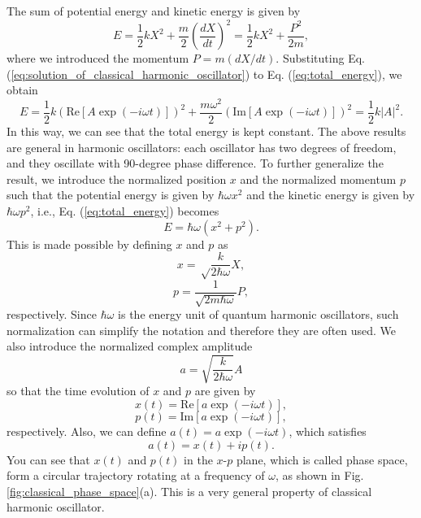 The sum of potential energy and kinetic energy is given by
\begin{equation}
  E = \frac{1}{2}kX^2 + \frac{m}{2}\left(\frac{dX}{dt} \right)^2 = \frac{1}{2}kX^2 + \frac{P^2}{2m},
  \label{eq:total_energy}
\end{equation}
where we introduced the momentum $P = m(dX/dt)$. Substituting Eq. (\ref{eq:solution_of_classical_harmonic_oscillator}) to Eq. (\ref{eq:total_energy}), we obtain
\begin{equation}
  E= \frac{1}{2}k(\mathrm{Re} [A\exp(-i\omega t)])^2 + \frac{m\omega^2}{2} (\mathrm{Im} [A\exp(-i\omega t)])^2 = \frac{1}{2}k|A|^2.
\end{equation}
In this way, we can see that the total energy is kept constant.
The above results are general in harmonic oscillators: each oscillator has two degrees of freedom, and they oscillate with 90-degree phase difference. To further generalize the result, we introduce the normalized position $x$ and the normalized momentum $p$ such that the potential energy is given by $\hbar \omega x^2$ and the kinetic energy is given by $\hbar \omega p^2$, i.e., Eq. (\ref{eq:total_energy}) becomes
\begin{equation}
  E = \hbar \omega (x^2 + p^2).
\end{equation}
This is made possible by defining $x$ and $p$ as
\begin{equation}
  x = \sqrt \frac{k}{2\hbar\omega} X,
  \label{eq:normalized_position}
\end{equation}
\begin{equation}
  p = \frac{1}{\sqrt{2m\hbar \omega}}P,
  \label{eq:normalized_momentum}
\end{equation}
respectively. Since $\hbar \omega$ is the energy unit of quantum harmonic oscillators, such normalization can simplify the notation and therefore they are often used. We also introduce the normalized complex amplitude
\begin{equation}
  a = \sqrt{\frac{k}{2\hbar \omega}}A
\end{equation}
so that the time evolution of $x$ and $p$ are given by
\begin{equation}
  x(t) = \mathrm{Re}[a \exp(-i\omega t)],
\end{equation}
\begin{equation}
  p(t) = \mathrm{Im}[a \exp(-i\omega t)],
\end{equation}
respectively. Also, we can define $a(t) = a\exp(-i\omega t)$, which satisfies
\begin{equation}
  a(t) = x(t) + ip(t).
  \label{eq:normalized_complex_amplitude}
\end{equation}
You can see that $x(t)$ and $p(t)$ in the $x$-$p$ plane, which is called phase space, form a circular trajectory rotating at a frequency of $\omega$, as shown in Fig. {\ref{fig:classical_phase_space}}(a). This is a very general property of classical harmonic oscillator. 

